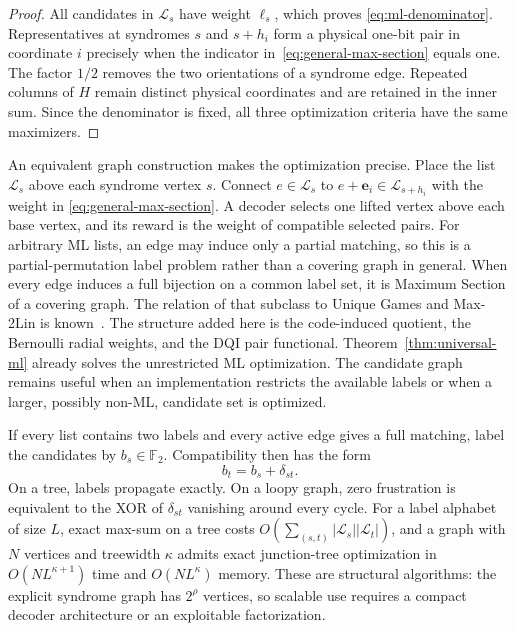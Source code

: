 \documentclass[journal]{IEEEtran}
\theoremstyle{definition}
\theoremstyle{remark}
\newcommand{\F}{\mathbb F}
\begin{document}
\begin{proof}
All candidates in $\mathcal L_s$ have weight $\ell_s$, which proves
\eqref{eq:ml-denominator}.  Representatives at syndromes $s$ and $s+h_i$
form a physical one-bit pair in coordinate $i$ precisely when the indicator
in~\eqref{eq:general-max-section} equals one.  The factor $1/2$ removes the two
orientations of a syndrome edge.  Repeated columns of $H$ remain distinct
physical coordinates and are retained in the inner sum.  Since the
denominator is fixed, all three optimization criteria have the same maximizers.
\end{proof}

An equivalent graph construction makes the optimization precise.  Place the list
$\mathcal L_s$ above each syndrome vertex $s$.  Connect $e\in\mathcal L_s$ to
$e+\mathbf e_i\in\mathcal L_{s+h_i}$ with the weight in
\eqref{eq:general-max-section}.  A decoder selects one lifted vertex above
each base vertex, and its reward is the weight of compatible selected pairs.
For arbitrary ML lists, an edge may induce only a partial matching, so this is
a partial-permutation label problem rather than a covering graph in general.
When every edge induces a full bijection on a common label set, it is Maximum
Section of a covering graph.  The relation of that subclass to Unique Games
and Max-2Lin is known~\cite{grochow2018}.  The structure added here is the
code-induced quotient, the Bernoulli radial weights, and the DQI pair
functional.  Theorem~\ref{thm:universal-ml} already solves the unrestricted
ML optimization.  The candidate graph remains useful when an implementation
restricts the available labels or when a larger, possibly non-ML, candidate
set is optimized.

If every list contains two labels and every active edge gives a full matching,
label the candidates by $b_s\in\F_2$.  Compatibility then has the form
\begin{equation}
 b_t=b_s+\delta_{st}.
 \label{eq:max2lin}
\end{equation}
On a tree, labels propagate exactly.  On a loopy graph, zero frustration is
equivalent to the XOR of $\delta_{st}$ vanishing around every cycle.  For a
label alphabet of size $L$, exact max-sum on a tree costs
$O(\sum_{(s,t)}|\mathcal L_s||\mathcal L_t|)$, and a graph with $N$ vertices
and treewidth $\kappa$ admits exact junction-tree optimization in
$O(NL^{\kappa+1})$ time and $O(NL^\kappa)$ memory.  These are structural
algorithms: the explicit syndrome graph has $2^\rho$ vertices, so scalable
use requires a compact decoder architecture or an exploitable factorization.
\end{document}
